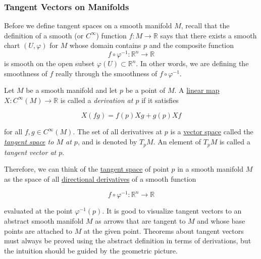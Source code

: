 \documentclass{article}
\newcounter{definition}[section]
\begin{document}
    \subsubsection{Tangent Vectors on Manifolds}

      Before we define tangent spaces on a smooth manifold $M$, recall that the definition of a smooth (or $C^\infty$) function $f: M \to \mathbb{R}$ says that there exists a smooth chart $(U, \varphi)$ for $M$ whose domain contains $p$ and the composite function
      \begin{equation}
        f \circ \varphi^{-1}: \mathbb{R}^n \to \mathbb{R}
      \end{equation}
      is smooth on the open subset $\varphi(U) \subset \mathbb{R}^n$. In other words, we are defining the smoothness of $f$ really through the smoothness of $f \circ \varphi^{-1}$. 

      \begin{definition}[Derivation at $p$]
        \label{def:derivation-at-p}
        Let $M$ be a smooth manifold and let $p$ be a point of $M$. A \hyperref[lin-def:linear_map]{linear map} $X: C^\infty (M) \to \mathbb{R}$ is called a \textit{derivation at $p$} if it satisfies 

          \begin{equation}
            X(f g) = f(p) X g + g(p) X f
          \end{equation}

        for all $f, g \in C^\infty (M)$. The set of all derivatives at $p$ is a \hyperref[lin-def:vector-space]{vector space} called the \textit{\hyperref[mv-def:tangent-space]{tangent space} to $M$ at $p$}, and is denoted by $T_p M$. An element of $T_p M$ is called a \textit{tangent vector at $p$}. 
      \end{definition}

      Therefore, we can think of the \hyperref[mv-def:tangent-space]{tangent space} of point $p$ in a smooth manifold $M$ as the space of all \hyperref[mv-def:directional-derivative]{directional derivatives} of a smooth function 

        \begin{equation}
          f \circ \varphi^{-1}: \mathbb{R}^n \to \mathbb{R}
        \end{equation}

      evaluated at the point $\varphi^{-1} (p)$. It is good to visualize tangent vectors to an abstract smooth manifold $M$ as arrows that are tangent to $M$ and whose base points are attached to $M$ at the given point. Theorems about tangent vectors must always be proved using the abstract definition in terms of derivations, but the intuition should be guided by the geometric picture. 
\end{document}
